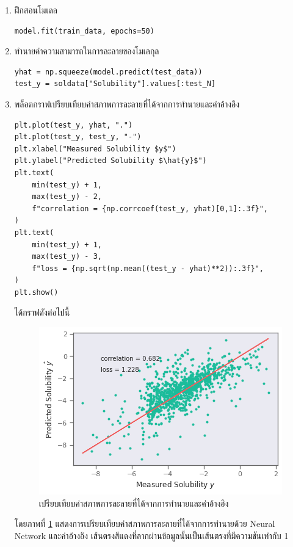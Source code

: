 \begin{enumerate}
          \vspace{1em}

    \item ฝึกสอนโมเดล

          \begin{lstlisting}[style=MyPython]
model.fit(train_data, epochs=50)
\end{lstlisting}

          \vspace{1em}

    \item ทำนายค่าความสามารถในการละลายของโมเลกุล

          \begin{lstlisting}[style=MyPython]
yhat = np.squeeze(model.predict(test_data))
test_y = soldata["Solubility"].values[:test_N]
\end{lstlisting}

          \vspace{1em}

    \item พล็อตกราฟเปรียบเทียบค่าสภาพการละลายที่ได้จากการทำนายและค่าอ้างอิง

          \begin{lstlisting}[style=MyPython]
plt.plot(test_y, yhat, ".")
plt.plot(test_y, test_y, "-")
plt.xlabel("Measured Solubility $y$")
plt.ylabel("Predicted Solubility $\hat{y}$")
plt.text(
    min(test_y) + 1,
    max(test_y) - 2,
    f"correlation = {np.corrcoef(test_y, yhat)[0,1]:.3f}",
)
plt.text(
    min(test_y) + 1,
    max(test_y) - 3,
    f"loss = {np.sqrt(np.mean((test_y - yhat)**2)):.3f}",
)
plt.show()
\end{lstlisting}

          \vspace{1em}
          \noindent ได้กราฟดังต่อไปนี้

          \begin{figure}[H]
              \centering
              \includegraphics[width=0.7\linewidth]{fig/predict_solubility.png}
              \caption{เปรียบเทียบค่าสภาพการละลายที่ได้จากการทำนายและค่าอ้างอิง}
              \label{fig:pred_solubility}
          \end{figure}

          โดยภาพที่ \ref{fig:pred_solubility} แสดงการเปรียบเทียบค่าสภาพการละลายที่ได้จากการทำนายด้วย Neural Network และค่าอ้างอิง เส้นตรงสีแดงที่ลากผ่านข้อมูลนั้นเป็นเส้นตรงที่มีความชันเท่ากับ 1

\end{enumerate}
